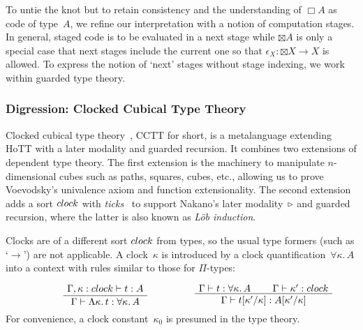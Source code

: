 \documentclass[a4paper,UKenglish,numberwithinsect,cleveref,thm-restate,draft]{lipics-v2021}
\numberwithin{equation}{section}
\theoremstyle{definition}
\theoremstyle{plain}
\begin{document}
To untie the knot but to retain consistency and the understanding of $\Box A$ as code of type~$A$, we refine our interpretation with a notion of computation stages.
In general, staged code is to be evaluated in a next stage while   $\boxtimes A$ is only a special case that next stages include the current one so that $\epsilon_X\colon {\boxtimes} X \to X$ is allowed.
To express the notion of `next' stages without stage indexing, we work within guarded type theory.

\subsubsection{Digression: Clocked Cubical Type Theory}
Clocked cubical type theory~\cite{Kristensen2021}, CCTT for short, is a metalanguage extending HoTT with a later modality and guarded recursion.
It combines two extensions of dependent type theory.
The first extension is the machinery to manipulate $n$-dimensional cubes such as paths, squares, cubes, etc., allowing us to prove Voevodsky’s univalence axiom and function extensionality.
The second extension adds a sort $\clock$ with \emph{ticks}~\cite{Bahr2017} to support Nakano's later modality~$\mathord{\triangleright}$ and guarded recursion, where the latter is also known as \emph{Löb induction}.

Clocks are of a different sort $\clock$ from types, so the usual type formers (such as `$\to$') are not applicable.
A clock~$\kappa$ is introduced by a clock quantification~$\forall \kappa.\, A$ into a context with rules similar to those for $\Pi$-types:
\[
  \begin{minipage}{0.47\linewidth}
    \begin{prooftree}
      \AxiomC{$\Gamma, \kappa : \clock \vdash t : A$}
      \UnaryInfC{$\Gamma \vdash \Lambda \kappa.\, t : \forall \kappa.\, A $}
    \end{prooftree}
  \end{minipage}
  \begin{minipage}{0.47\linewidth}
    \begin{prooftree}
      \AxiomC{$\Gamma \vdash t : \forall \kappa.\, A$}
      \AxiomC{$\Gamma \vdash \kappa' : \clock $}
      \BinaryInfC{$\Gamma \vdash t[\kappa'/\kappa] : A[\kappa'/\kappa]$}
    \end{prooftree}
  \end{minipage}
\]
For convenience, a clock constant~$\kappa_0$ is presumed in the type theory.%
\end{document}
